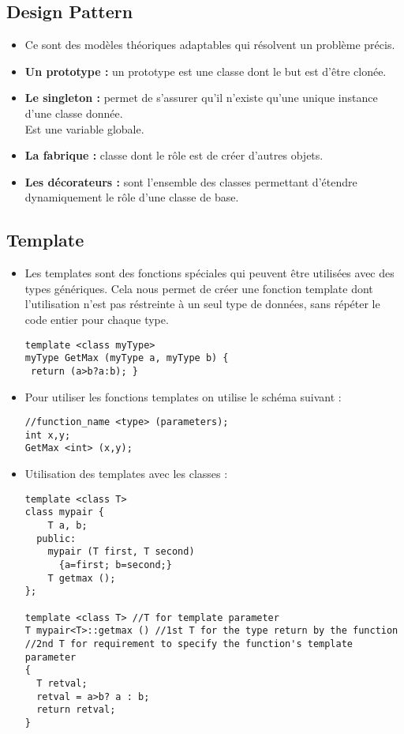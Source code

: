 \documentclass[12pt,a4paper]{article}
\begin{document}
\subsection{Design Pattern}
\begin{itemize}
\item Ce sont des modèles théoriques adaptables qui résolvent un problème précis.
\item \textbf{Un prototype :} un prototype est une classe dont le but est d'être clonée. 
\item \textbf{Le singleton :} permet de s'assurer qu'il n'existe qu'une unique instance d'une classe donnée. \\
Est une variable globale.
\item \textbf{La fabrique :} classe dont le rôle est de créer d'autres objets.
\item \textbf{Les décorateurs :} sont l'ensemble des classes permettant d'étendre dynamiquement le rôle d'une classe de base.
\end{itemize}

\subsection{Template}
\begin{itemize}
\item Les templates sont des fonctions spéciales qui peuvent être utilisées avec des types génériques. Cela nous permet de créer une fonction template dont l'utilisation n'est pas réstreinte à un seul type de données, sans répéter le code entier pour chaque type.
\begin{lstlisting}
template <class myType>
myType GetMax (myType a, myType b) {
 return (a>b?a:b); }
\end{lstlisting}
\item Pour utiliser les fonctions templates on utilise le schéma suivant :
\begin{lstlisting}
//function_name <type> (parameters);
int x,y;
GetMax <int> (x,y);
\end{lstlisting}
\item Utilisation des templates avec les classes :
\begin{lstlisting}
template <class T>
class mypair {
    T a, b;
  public:
    mypair (T first, T second)
      {a=first; b=second;}
    T getmax ();
};

template <class T> //T for template parameter
T mypair<T>::getmax () //1st T for the type return by the function
//2nd T for requirement to specify the function's template parameter
{
  T retval;
  retval = a>b? a : b;
  return retval;
}
\end{lstlisting}
\end{itemize}
\end{document}
